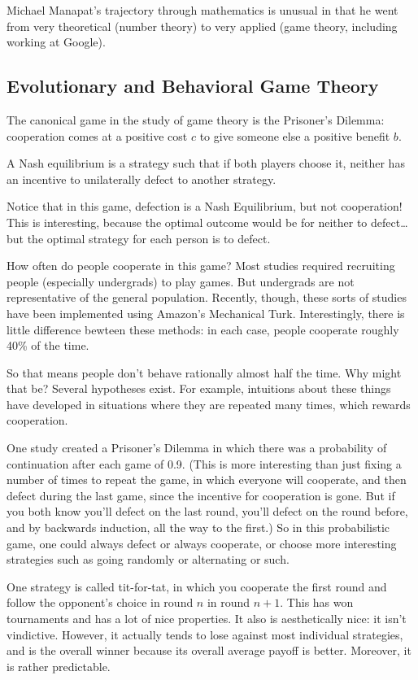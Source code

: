 Michael Manapat's trajectory through mathematics is unusual in that he went from very theoretical (number theory) to very applied (game theory, including working at Google).

\subsection{Evolutionary and Behavioral Game Theory}
The canonical game in the study of game theory is the Prisoner's Dilemma: cooperation comes at a positive cost $c$ to give someone else a positive benefit $b$.
\begin{defn}
A Nash equilibrium is a strategy such that if both players choose it, neither has an incentive to unilaterally defect to another strategy.
\end{defn}
Notice that in this game, defection is a Nash Equilibrium, but not cooperation! This is interesting, because the optimal outcome would be for neither to defect\dots{} but the optimal strategy for each person is to defect.

How often do people cooperate in this game? Most studies required recruiting people (especially undergrads) to play games. But undergrads are not representative of the general population. Recently, though, these sorts of studies have been implemented using Amazon's Mechanical Turk. Interestingly, there is little difference bewteen these methods: in each case, people cooperate roughly 40\% of the time.

So that means people don't behave rationally almost half the time. Why might that be? Several hypotheses exist. For example, intuitions about these things have developed in situations where they are repeated many times, which rewards cooperation.

One study created a Prisoner's Dilemma in which there was a probability of continuation after each game of 0.9. (This is more interesting than just fixing a number of times to repeat the game, in which everyone will cooperate, and then defect during the last game, since the incentive for cooperation is gone. But if you both know you'll defect on the last round, you'll defect on the round before, and by backwards induction, all the way to the first.) So in this probabilistic game, one could always defect or always cooperate, or choose more interesting strategies such as going randomly or alternating or such.

One strategy is called tit-for-tat, in which you cooperate the first round and follow the opponent's choice in round $n$ in round $n+1$. This has won tournaments and has a lot of nice properties. It also is aesthetically nice: it isn't vindictive. However, it actually tends to lose against most individual strategies, and is the overall winner because its overall average payoff is better. Moreover, it is rather predictable.

